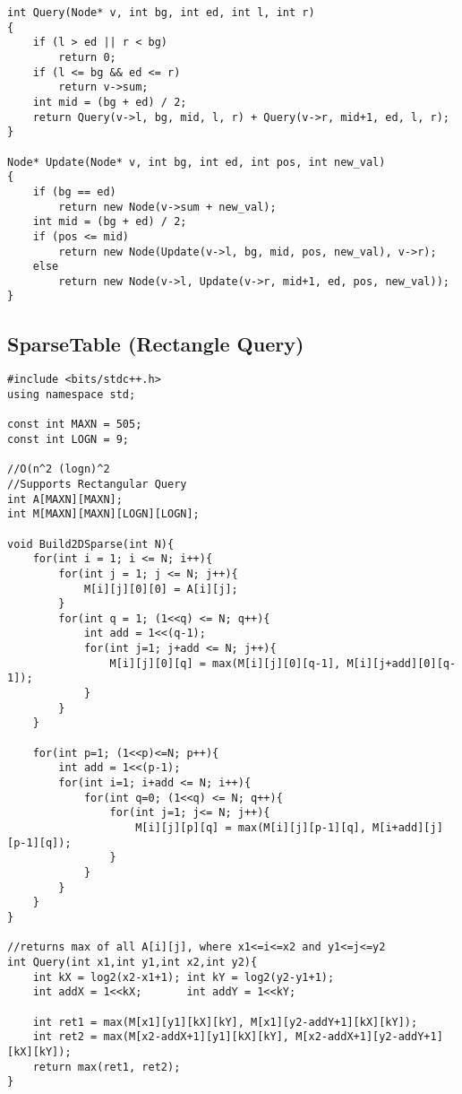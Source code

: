 \documentclass[FSZ,a4paper,onesided]{article}
\begin{document}
\begin{multicols*}{\COLS}
\begin{lstlisting}
int Query(Node* v, int bg, int ed, int l, int r) 
{
    if (l > ed || r < bg)
        return 0;
    if (l <= bg && ed <= r)
        return v->sum;
    int mid = (bg + ed) / 2;
    return Query(v->l, bg, mid, l, r) + Query(v->r, mid+1, ed, l, r);
}
 
Node* Update(Node* v, int bg, int ed, int pos, int new_val) 
{
    if (bg == ed)
        return new Node(v->sum + new_val);
    int mid = (bg + ed) / 2;
    if (pos <= mid)
        return new Node(Update(v->l, bg, mid, pos, new_val), v->r);
    else
        return new Node(v->l, Update(v->r, mid+1, ed, pos, new_val));
}\end{lstlisting}
\subsection{SparseTable (Rectangle Query)}
\begin{lstlisting}
#include <bits/stdc++.h>
using namespace std;

const int MAXN = 505;
const int LOGN = 9;

//O(n^2 (logn)^2
//Supports Rectangular Query
int A[MAXN][MAXN];
int M[MAXN][MAXN][LOGN][LOGN];

void Build2DSparse(int N){
    for(int i = 1; i <= N; i++){
        for(int j = 1; j <= N; j++){
            M[i][j][0][0] = A[i][j];
        }
        for(int q = 1; (1<<q) <= N; q++){
            int add = 1<<(q-1);
            for(int j=1; j+add <= N; j++){
                M[i][j][0][q] = max(M[i][j][0][q-1], M[i][j+add][0][q-1]);
            }
        }
    }

    for(int p=1; (1<<p)<=N; p++){
        int add = 1<<(p-1);
        for(int i=1; i+add <= N; i++){
            for(int q=0; (1<<q) <= N; q++){
                for(int j=1; j<= N; j++){
                    M[i][j][p][q] = max(M[i][j][p-1][q], M[i+add][j][p-1][q]);
                }
            }
        }
    }
}

//returns max of all A[i][j], where x1<=i<=x2 and y1<=j<=y2
int Query(int x1,int y1,int x2,int y2){
    int kX = log2(x2-x1+1); int kY = log2(y2-y1+1);
    int addX = 1<<kX;       int addY = 1<<kY;

    int ret1 = max(M[x1][y1][kX][kY], M[x1][y2-addY+1][kX][kY]);
    int ret2 = max(M[x2-addX+1][y1][kX][kY], M[x2-addX+1][y2-addY+1][kX][kY]);
    return max(ret1, ret2);
}
\end{lstlisting}

\end{multicols*}
\end{document}
